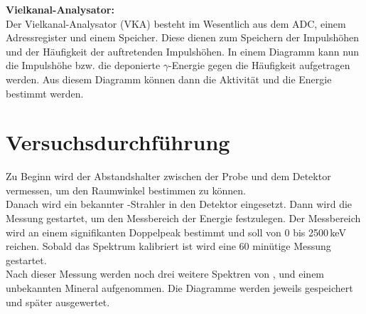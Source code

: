 \textbf{Vielkanal-Analysator:} \\
Der Vielkanal-Analysator (VKA) besteht im Wesentlich aus dem ADC, einem Adressregister und einem Speicher. Diese dienen zum Speichern der Impulshöhen und der Häufigkeit der auftretenden Impulshöhen. In einem Diagramm kann nun die Impulshöhe bzw. die deponierte $\gamma$-Energie gegen die Häufigkeit aufgetragen werden. Aus diesem Diagramm können dann die Aktivität und die Energie bestimmt werden. \\



\section{Versuchsdurchführung}
Zu Beginn wird der Abstandshalter zwischen der Probe und dem Detektor vermessen, um den Raumwinkel bestimmen zu können. \\
Danach wird ein bekannter -Strahler in den Detektor eingesetzt. Dann wird die Messung gestartet, um den Messbereich der Energie festzulegen. Der Messbereich wird an einem signifikanten Doppelpeak bestimmt und soll von 0 bis 2500\,keV reichen. Sobald das Spektrum kalibriert ist wird eine 60 minütige Messung gestartet. \\
Nach dieser Messung werden noch drei weitere Spektren von ,  und einem unbekannten Mineral aufgenommen. Die Diagramme werden jeweils gespeichert und später ausgewertet.
